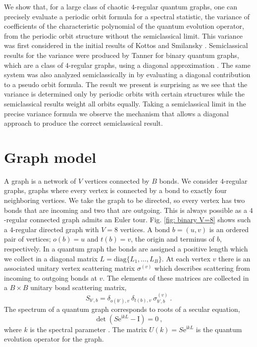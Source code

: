 \documentclass[doublecol]{epl2}
\newcommand{\rmi}{\mathrm{i}}
\newcommand{\rme}{\mathrm{e}}
\newcommand{\diag}{\mathrm{diag}}
\newcommand{\UI}{\mathrm{I}}
\begin{document}
We show that, for a large class of chaotic $4$-regular quantum graphs, one can precisely evaluate a periodic orbit formula for a spectral statistic, the variance of coefficients of the characteristic polynomial of the quantum evolution operator, from the periodic orbit structure without the semiclassical limit.  This variance was first considered in the initial results of Kottos and Smilansky \cite{KS99}.  Semiclassical results for the variance were produced by Tanner  for binary quantum graphs, which are a class of $4$-regular graphs, using a diagonal approximation \cite{T02}.  The same system was also analyzed semiclassically in \cite{BHS19}  by evaluating a diagonal contribution to a pseudo orbit formula. 
The result we present is surprising as we see that the variance is determined only by periodic orbits with certain structures while the semiclassical results weight all orbits equally.  Taking a semiclassical limit in the precise variance formula we observe the mechanism that allows a diagonal approach to produce the correct semiclassical result.

\section{Graph model}

A graph is a network of $V$ vertices connected by $B$ bonds.  We consider $4$-regular graphs, graphs where every vertex is connected by a bond to exactly four neighboring vertices.  
We take the graph to be directed, so every vertex has two bonds that are incoming and two that are outgoing.  
This is always possible as a $4$-regular connected graph admits an Euler tour.
Fig. \ref{fig: binary V=8} shows such a $4$-regular directed graph with $V=8$ vertices.  A bond $b=(u,v)$ is an ordered pair of vertices; $o(b)=u$ and $t(b)=v$, the origin and terminus of $b$, respectively.
In a quantum graph the bonds are assigned a positive length which we collect in a diagonal matrix $L=\diag\{ L_1,\dots,L_{B} \}$.   At each vertex $v$ there is an associated unitary vertex scattering matrix $\sigma^{(v)}$ which describes scattering from incoming to outgoing bonds at $v$. The elements of these matrices are collected in a $B\times B$ unitary bond scattering matrix, %
\begin{equation}
\label{eq:bondSmatrix}
S_{b',b} = \delta_{o(b'),v}\ \delta_{t(b),v}\   \sigma_{b',b}^{(v)} \ . 
\end{equation}  
The spectrum of a quantum graph corresponds to roots of a secular equation,
\begin{equation}
\label{eq:secular}
\det(S \rme^{\rmi k L}-\UI)=0 \ ,
\end{equation}
where $k$ is the spectral parameter \cite{KS97,KS99}.  
The matrix $U(k)=S \rme^{\rmi k L}$ is the quantum evolution operator for the graph. 
\end{document}
